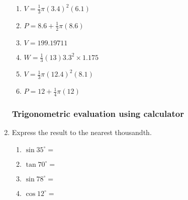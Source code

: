\begin{enumerate}
\begin{multicols}{2}
\begin{enumerate}
    \item $V=\frac{1}{3} \pi (3.4)^2(6.1)$
    \item $P=8.6 + \frac{1}{2} \pi (8.6)$  
    \item $V=199.19711$
    \item $W=\frac{1}{3} (13)  3.3^2 \times 1.175$
    \item $V=\frac{1}{3} \pi (12.4)^2(8.1)$
    \item $P=12 + \frac{1}{4} \pi (12)$ 
  \end{enumerate}
  \end{multicols}%

  
\subsubsection*{Trigonometric evaluation using calculator}
\item Express the result to the nearest thousandth.  \vspace{1cm}
  \begin{multicols}{2}
    \begin{enumerate}
      \item $\sin 35^\circ = $ %
      \item $\tan 70^\circ =$
      \item $\sin 78^\circ = $ %
      \item $\cos 12^\circ =$
    \end{enumerate}
  \end{multicols} %


\end{enumerate}
